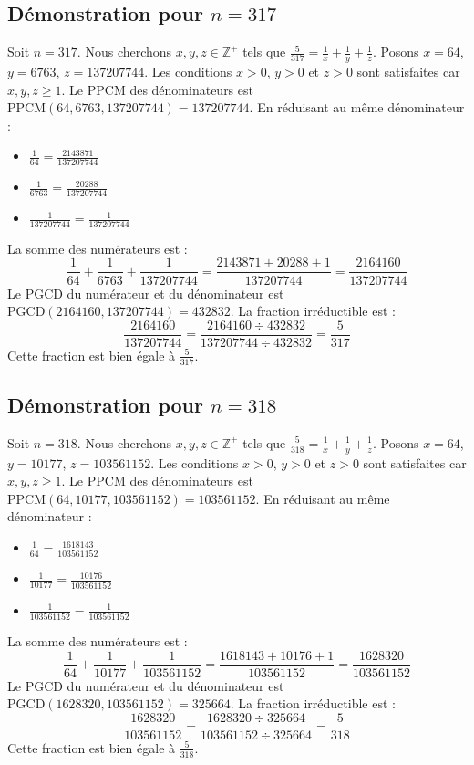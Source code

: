 \documentclass[11pt,a4paper]{article}
\begin{document}
\subsection{Démonstration pour $n = 317$}
Soit $n = 317$. Nous cherchons $x, y, z \in \mathbb{Z}^{+}$ tels que $\frac{5}{317} = \frac{1}{x} + \frac{1}{y} + \frac{1}{z}$.
Posons $x = 64$, $y = 6763$, $z = 137207744$.
Les conditions $x > 0$, $y > 0$ et $z > 0$ sont satisfaites car $x, y, z \geq 1$.
Le PPCM des dénominateurs est $\text{PPCM}(64, 6763, 137207744) = 137207744$.
En réduisant au même dénominateur :
\begin{itemize}
    \item $\frac{1}{64} = \frac{2143871}{137207744}$
    \item $\frac{1}{6763} = \frac{20288}{137207744}$
    \item $\frac{1}{137207744} = \frac{1}{137207744}$
\end{itemize}
La somme des numérateurs est :
$$ \frac{1}{64} + \frac{1}{6763} + \frac{1}{137207744} = \frac{2143871 + 20288 + 1}{137207744} = \frac{2164160}{137207744} $$
Le PGCD du numérateur et du dénominateur est $\text{PGCD}(2164160, 137207744) = 432832$.
La fraction irréductible est :
$$ \frac{2164160}{137207744} = \frac{2164160 \div 432832}{137207744 \div 432832} = \frac{5}{317} $$
Cette fraction est bien égale à $\frac{5}{317}$.

\subsection{Démonstration pour $n = 318$}
Soit $n = 318$. Nous cherchons $x, y, z \in \mathbb{Z}^{+}$ tels que $\frac{5}{318} = \frac{1}{x} + \frac{1}{y} + \frac{1}{z}$.
Posons $x = 64$, $y = 10177$, $z = 103561152$.
Les conditions $x > 0$, $y > 0$ et $z > 0$ sont satisfaites car $x, y, z \geq 1$.
Le PPCM des dénominateurs est $\text{PPCM}(64, 10177, 103561152) = 103561152$.
En réduisant au même dénominateur :
\begin{itemize}
    \item $\frac{1}{64} = \frac{1618143}{103561152}$
    \item $\frac{1}{10177} = \frac{10176}{103561152}$
    \item $\frac{1}{103561152} = \frac{1}{103561152}$
\end{itemize}
La somme des numérateurs est :
$$ \frac{1}{64} + \frac{1}{10177} + \frac{1}{103561152} = \frac{1618143 + 10176 + 1}{103561152} = \frac{1628320}{103561152} $$
Le PGCD du numérateur et du dénominateur est $\text{PGCD}(1628320, 103561152) = 325664$.
La fraction irréductible est :
$$ \frac{1628320}{103561152} = \frac{1628320 \div 325664}{103561152 \div 325664} = \frac{5}{318} $$
Cette fraction est bien égale à $\frac{5}{318}$.
\end{document}
